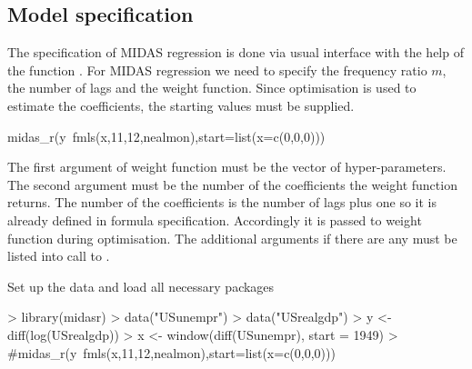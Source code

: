 \documentclass[nojss]{jss}
\begin{document}
\subsection{Model specification}

The specification of MIDAS regression is done via usual 
interface with the help of the function . For MIDAS
regression we need to specify the frequency ratio $m$, the number of
lags and the weight function. Since optimisation is used to estimate
the coefficients, the starting values must be supplied. 

\begin{Code}
midas_r(y~fmls(x,11,12,nealmon),start=list(x=c(0,0,0)))  
\end{Code}

The first argument of weight function must be the vector of
hyper-parameters. The second argument must be the number of the
coefficients the weight function returns. The number of the
coefficients is the number of lags plus one  so it is already defined
in formula specification. Accordingly it is passed to weight function
during optimisation. The additional arguments if there are any must be
listed into call to .

Set up the data and load all necessary packages
\begin{Schunk}
\begin{Sinput}
> library(midasr)
> data("USunempr")
> data("USrealgdp")
> y <- diff(log(USrealgdp))
> x <- window(diff(USunempr), start = 1949)
> #midas_r(y~fmls(x,11,12,nealmon),start=list(x=c(0,0,0)))
\end{Sinput}
\end{Schunk}

%
\end{document}
